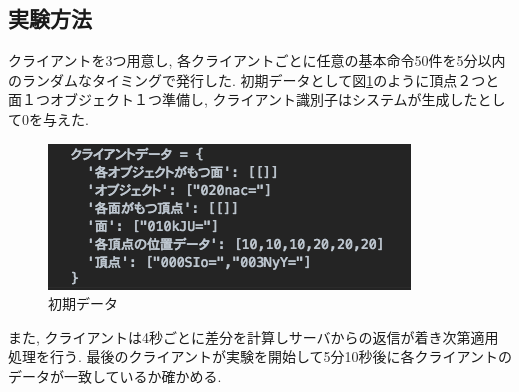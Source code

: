 \subsection{実験方法}
クライアントを3つ用意し, 各クライアントごとに任意の基本命令50件を5分以内のランダムなタイミングで発行した. 初期データとして図\ref{init}のように頂点２つと面１つオブジェクト１つ準備し, クライアント識別子はシステムが生成したとして0を与えた.
\begin{figure}[htbp]
 \begin{center}
	 \includegraphics[scale=0.7]{images/init}
	 \caption{初期データ}
	 \label{init}
 \end{center}
\end{figure}
また, クライアントは4秒ごとに差分を計算しサーバからの返信が着き次第適用処理を行う. 最後のクライアントが実験を開始して5分10秒後に各クライアントのデータが一致しているか確かめる.
